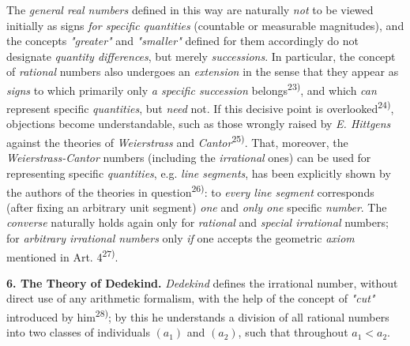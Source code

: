 \thispagestyle{fancy}

\vspace{0.5cm}

The \textit{general real numbers} defined in this way are naturally \textit{not} to be viewed initially as signs \textit{for specific quantities} (countable or measurable magnitudes), and the concepts \textit{"greater"} and \textit{"smaller"} defined for them accordingly do not designate \textit{quantity differences}, but merely \textit{successions}. In particular, the concept of \textit{rational} numbers also undergoes an \textit{extension} in the sense that they appear as \textit{signs} to which primarily only \textit{a specific succession} belongs\textsuperscript{23)}, and which \textit{can} represent specific \textit{quantities}, but \textit{need} not. If this decisive point is overlooked\textsuperscript{24)}, objections become understandable, such as those wrongly raised by \textit{E. Hittgens} against the theories of \textit{Weierstrass} and \textit{Cantor}\textsuperscript{25)}. That, moreover, the \textit{Weierstrass-Cantor} numbers (including the \textit{irrational} ones) can be used for representing specific \textit{quantities}, e.g. \textit{line segments}, has been explicitly shown by the authors of the theories in question\textsuperscript{26)}: to \textit{every line segment} corresponds (after fixing an arbitrary unit segment) \textit{one} and \textit{only one} specific \textit{number}. The \textit{converse} naturally holds again only for \textit{rational} and \textit{special irrational} numbers; for \textit{arbitrary irrational numbers} only \textit{if} one accepts the geometric \textit{axiom} mentioned in Art. 4\textsuperscript{27)}.

\vspace{0.5cm}

\textbf{6. The Theory of Dedekind.} \textit{Dedekind} defines the irrational number, without direct use of any arithmetic formalism, with the help of the concept of \textit{"cut"} introduced by him\textsuperscript{28)}; by this he understands a division of all rational numbers into two classes of individuals $(a_1)$ and $(a_2)$, such that throughout $a_1 < a_2$.

